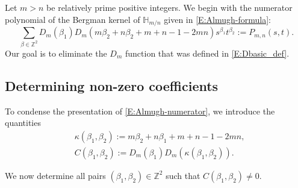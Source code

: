 \documentclass[letterpaper,11pt,reqno]{amsart}
\theoremstyle{plain}
\theoremstyle{definition}
\theoremstyle{remark}
\theoremstyle{remark}
\numberwithin{equation}{section}
\newcommand{\h}{{\mathbb H}}
\newcommand{\Z}{{\mathbb Z}}
\begin{document}
Let $m>n$ be relatively prime positive integers.
We begin with the numerator polynomial of the Bergman kernel of $\h_{m/n}$ given in \eqref{E:Almugh-formula}:
\begin{equation}\label{E:Almugh-numerator}
\sum_{\beta\in \Z^2} D_m(\beta_1) D_m(m\beta_2+n\beta_2 + m + n -1 -2mn) s^{\beta_1} t^{\beta_2} := P_{m,n}(s,t).
\end{equation}
Our goal is to eliminate the $D_m$ function that was defined in \eqref{E:Dbasic_def}.

\subsection{Determining non-zero coefficients}

To condense the presentation of \eqref{E:Almugh-numerator}, we introduce the quantities
\begin{align}
&\kappa(\beta_1,\beta_2) := m\beta_2+n\beta_1 + m + n -1 -2mn, \label{E:def-of-kappa(b1,b2)} \\
&C(\beta_1,\beta_2) := D_m(\beta_1) D_m(\kappa(\beta_1,\beta_2)). \label{E:def-of-C(b1,b2)}
\end{align}

We now determine all pairs $(\beta_1,\beta_2) \in \Z^2$ such that $C(\beta_1,\beta_2) \neq 0$. 
\end{document}

